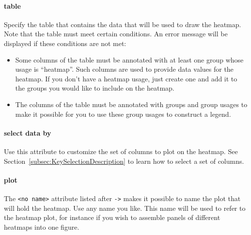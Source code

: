 \paragraph{table}
Specify the table that contains the data that will be used to draw the heatmap. Note that the table must meet certain conditions. An error message will be displayed if these conditions are not met:

\begin{itemize}
  \item Some columns of the table must be annotated with at least one group whose usage is ``heatmap''. Such columns are used to provide data values for the heatmap. If you don't have a heatmap usage, just create one and add it to the groups you would like to include on the heatmap.
  \item The columns of the table must be annotated with groups and group usages to make it possible for you to use these group usages to construct a legend.
\end{itemize}

\paragraph{select data by}
Use this attribute to customize the set of columns to plot on the heatmap. See Section~\ref{subsec:KeySelectionDescription} to learn how to select a set of columns.

\paragraph{plot}
The \texttt{<no name>} attribute listed after \texttt{->} makes it possible to name the plot that will hold the heatmap. Use any name you like. This name will be used to refer to the heatmap plot, for instance if you wish to assemble panels of different heatmaps into one figure.

